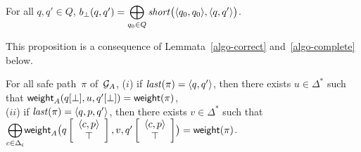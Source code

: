 \begin{proposition}\label{algo-shortest}
For all $q, q' \in Q$, 
$b_\bot(q, q') = \displaystyle\bigoplus_{q_0 \in Q} \mathit{short}\bigl(\< q_0, q_0>, \< q, q'>\bigr)$.
\end{proposition}
This proposition is a consequence of Lemmata~\ref{algo-correct} and~\ref{algo-complete} below.



\begin{lemma}[Correctness]\label{algo-correct}
For all safe path~$\pi$ of~$\mathcal{G}_A$,  %
($i$) if $\last(\pi) = \< q, q'>$, %
then there exists $u \in \Delta^*$ such that 
$\mathsf{weight}_A(q[\bot], u, q'[\bot]) = \mathsf{weight}(\pi)$,\\
%
($ii$) if $\last(\pi) = \< q, p, q'>$, %
then there exists $v \in \Delta^*$ such that \\
${\displaystyle\bigoplus_{c \in \Deltac}}
 \weight_A\bigl(\configup{q}{\< c, p> \stackup \top }, v, \configup{q'}{\<c, p> \stackup \top}\bigr)
 = \weight(\pi)$.
\end{lemma}
%
